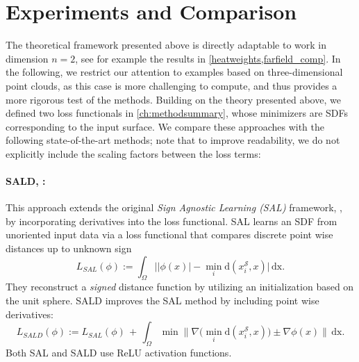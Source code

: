 \documentclass[12pt,openany]{book}
\def\S{\mathcal{S}}
\theoremstyle{plainnormal}
\theoremstyle{remark}
\begin{document}
\section{Experiments and Comparison}\label{Comps}
The theoretical framework presented above is directly adaptable to work in dimension $n=2$, see for example the results in \cref{heatweights,farfield_comp}. In the following, we restrict our attention to examples based on three-dimensional point clouds, as this case is more challenging to compute, and thus provides a more rigorous test of the methods. Building on the theory presented above, we defined two loss functionals in \cref{ch:methodsummary}, whose minimizers are SDFs corresponding to the input surface. We compare these approaches with the following state-of-the-art methods; note that to improve readability, we do not explicitly include the scaling factors between the loss terms:
\paragraph{SALD, \cite{SALD}:} This approach extends the original \emph{Sign Agnostic Learning (SAL)} framework, \cite{SAL}, by incorporating derivatives into the loss functional. SAL learns an SDF from unoriented input data via a loss functional that compares discrete point wise distances up to unknown sign
$$L_{SAL}(\phi) := \int_\Omega\big||\phi(x)| - \min_{i} \mathrm{d}( x_i^\S, x)\big|\,\mathrm{dx}.
$$
They reconstruct a \emph{signed} distance function by utilizing an initialization based on the unit sphere.
SALD improves the SAL method by including point wise derivatives:
$$L_{SALD}(\phi) := L_{SAL}(\phi)\, +\, \int_\Omega \min \|\nabla\big(\min_{i} \mathrm{d}( x_i^\S, x)\big) \pm \nabla \phi(x)\|  \,\mathrm{dx}.$$
Both SAL and SALD use ReLU activation functions.
\end{document}
